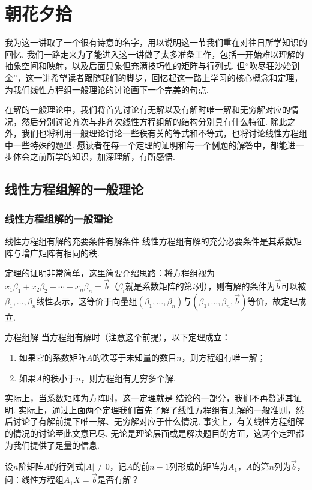 \chapter{朝花夕拾} \label{chap:朝花夕拾}

我为这一讲取了一个很有诗意的名字，用以说明这一节我们重在对往日所学知识的回忆. 我们一路走来为了能进入这一讲做了太多准备工作，包括一开始难以理解的抽象空间和映射，以及后面具象但充满技巧性的矩阵与行列式. 但``吹尽狂沙始到金''，这一讲希望读者跟随我们的脚步，回忆起这一路上学习的核心概念和定理，为我们线性方程组一般理论的讨论画下一个完美的句点.

在解的一般理论中，我们将首先讨论有无解以及有解时唯一解和无穷解对应的情况，然后分别讨论齐次与非齐次线性方程组解的结构分别具有什么特征. 除此之外，我们也将利用一般理论讨论一些秩有关的等式和不等式，也将讨论线性方程组中一些特殊的题型. 愿读者在每一个定理的证明和每一个例题的解答中，都能进一步体会之前所学的知识，加深理解，有所感悟.

\section{线性方程组解的一般理论}

\subsection{线性方程组解的一般理论}

\begin{theorem}{线性方程组有解的充要条件}{有解条件}
    线性方程组有解的充分必要条件是其系数矩阵与增广矩阵有相同的秩.
\end{theorem}
定理的证明非常简单，这里简要介绍思路：将方程组视为$x_1\beta_1+x_2\beta_2+\cdots+x_n\beta_n=\vec{b}$（$\beta_i$就是系数矩阵的第$i$列），则有解的条件为$\vec{b}$可以被$\beta_1,\ldots,\beta_n$线性表示，这等价于向量组$(\beta_1,\ldots,\beta_n)$与$(\beta_1,\ldots,\beta_n,\vec{b})$等价，故定理成立.

\begin{theorem}{}{方程组解}
    当方程组有解时（注意这个前提），以下定理成立：
    \begin{enumerate}
        \item 如果它的系数矩阵$A$的秩等于未知量的数目$n$，则方程组有唯一解；

        \item 如果$A$的秩小于$n$，则方程组有无穷多个解.
    \end{enumerate}
\end{theorem}
实际上，当系数矩阵为方阵时，这一定理就是 结论的一部分，我们不再赘述其证明. 实际上，通过上面两个定理我们首先了解了线性方程组有无解的一般准则，然后讨论了有解前提下唯一解、无穷解对应于什么情况. 事实上，有关线性方程组解的情况的讨论至此文意已尽. 无论是理论层面或是解决题目的方面，这两个定理都为我们提供了足量的信息.
\begin{example}{}{}
    设$n$阶矩阵$A$的行列式$|A|\neq 0$，记$A$的前$n-1$列形成的矩阵为$A_1$，$A$的第$n$列为$\vec{b}$，问：线性方程组$A_1X=\vec{b}$是否有解？
\end{example}

